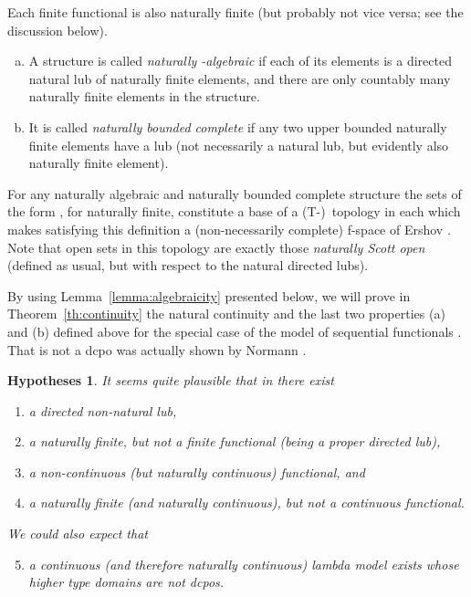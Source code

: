 \documentclass[fleqn]{LMCS}
\theoremstyle{plain}\newtheorem{satz}[thm]{Satz}
\theoremstyle{plain}\newtheorem{hyp}[thm]{Hypothesis}
\theoremstyle{plain}\newtheorem{hyps}[thm]{Hypotheses}
\theoremstyle{definition}\newtheorem{note}[thm]{Note}
\newcommand{\To}{T}
\newcommand{\fo}{f}
\newcommand{\?}{\mbox{?}}
\begin{document}
\noindent
Each finite functional is also naturally finite 
(but probably not vice versa; see the discussion below). 
\begin{defi}\label{def:alg-bound-compl-struct}\hfill  \begin{enumerate}[(a)]
\item A structure  
is called \emph{naturally -algebraic} if each of its elements 
is a directed natural lub of naturally finite elements, 
and there are only countably many naturally finite elements 
in the structure. 

\item It is called \emph{naturally bounded complete} if any two 
upper bounded 
naturally finite elements 
have a lub (not necessarily a natural lub, but evidently also naturally 
finite element). 
\end{enumerate}
\end{defi}

\noindent
For any naturally algebraic and naturally bounded complete structure  
the sets of the form , 
for  naturally finite, constitute a base of a \mbox{(\To-)}~topology in each  
which makes  satisfying this definition 
a (non-necessarily complete) \fo-space of Ershov \cite{Ershov72}. 
Note that open sets in this topology are exactly those \emph{naturally Scott open} 
(defined as usual, but with respect to the natural directed lubs). 


By using  
Lemma~\ref{lemma:algebraicity} presented below, 
we will prove in Theorem~\ref{th:continuity} 
the natural  continuity and the last two properties (a) and (b) defined above 
for the special case of the model of sequential 
functionals . 
That  
is not a dcpo was actually shown by Normann \cite{Normann2004}.
\begin{hyps}
It seems quite plausible
that in  
there exist
\begin{enumerate}[\em(1)]
\item
a directed non-natural  lub, 
\item 
a naturally finite, but not a finite functional 
(being a proper directed lub), 
\item
a non-continuous (but naturally continuous) functional, and 
\item 
a naturally finite (and naturally continuous), but not a continuous functional.
\end{enumerate}
We could also expect that 
\begin{enumerate}[\em(1)]
\setcounter{enumi}{4}
\item
a continuous (and therefore naturally continuous) lambda model exists 
whose higher type domains are not dcpos. 
\end{enumerate}
\end{hyps}
\end{document}
